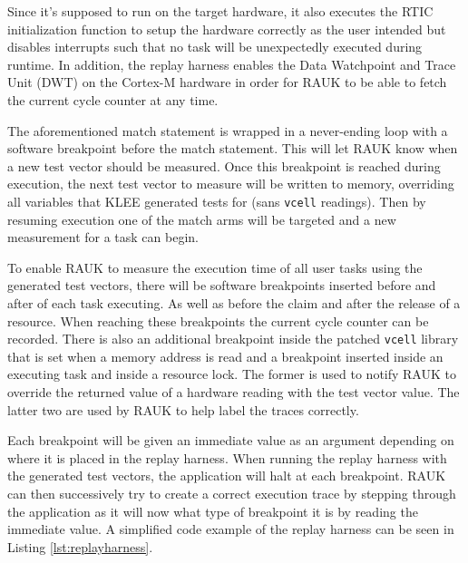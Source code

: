 Since it's supposed to run on the target hardware, it also executes the RTIC
initialization function to setup the hardware correctly as the user intended
but disables interrupts such that no task will be unexpectedly executed during
runtime. In addition, the replay harness enables the Data Watchpoint and Trace
Unit (DWT) on the Cortex-M hardware in order for RAUK to be able to fetch the
current cycle counter at any time.

The aforementioned match statement is wrapped in a never-ending loop with a
software breakpoint before the match statement. This will let RAUK know when a
new test vector should be measured. Once this breakpoint is reached during
execution, the next test vector to measure will be written to memory,
overriding all variables that KLEE generated tests for (sans \texttt{vcell}
readings). Then by resuming execution one of the match arms will be targeted
and a new measurement for a task can begin.

To enable RAUK to measure the execution time of all user tasks using the
generated test vectors, there will be software breakpoints inserted before and
after of each task executing. As well as before the claim and after the release
of a resource. When reaching these breakpoints the current cycle counter can be
recorded. There is also an additional breakpoint inside the patched
\texttt{vcell} library that is set when a memory address is read and a breakpoint
inserted inside an executing task and inside a resource lock. The former is
used to notify RAUK to override the returned value of a hardware reading with
the test vector value. The latter two are used by RAUK to help label the
traces correctly.



Each breakpoint will be given an immediate value as an argument depending on
where it is placed in the replay harness. When running the replay harness with
the generated test vectors, the application will halt at each breakpoint. RAUK
can then successively try to create a correct execution trace by stepping
through the application as it will now what type of breakpoint it is by reading
the immediate value. A simplified code example of the replay harness can be
seen in Listing \ref{lst:replayharness}.

